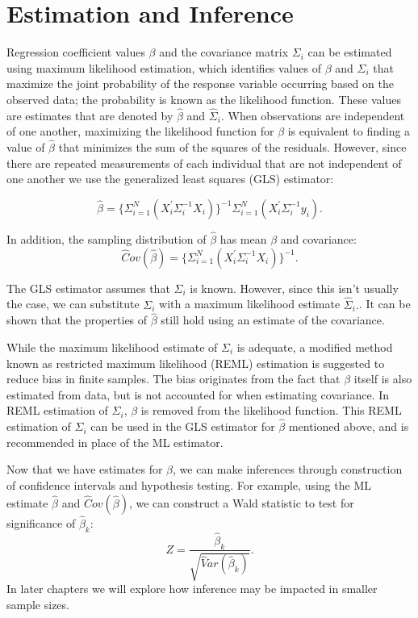\documentclass[12pt, twoside]{amherstthesis}
\begin{document}
\hypertarget{estimation-and-inference}{%
\section{Estimation and Inference}\label{estimation-and-inference}}

Regression coefficient values \(\beta\) and the covariance matrix \(\Sigma_i\) can be estimated using maximum likelihood estimation, which identifies values of \(\beta\) and \(\Sigma_i\) that maximize the joint probability of the response variable occurring based on the observed data; the probability is known as the likelihood function. These values are estimates that are denoted by \(\hat\beta\) and \(\hat\Sigma_i.\) When observations are independent of one another, maximizing the likelihood function for \(\beta\) is equivalent to finding a value of \(\hat\beta\) that minimizes the sum of the squares of the residuals. However, since there are repeated measurements of each individual that are not independent of one another we use the generalized least squares (GLS) estimator:

\[\hat\beta = \{ \Sigma_{i=1}^N(X_i^{'}\Sigma^{-1}_iX_i) \}^{-1}\Sigma_{i=1}^N(X_i^{'}\Sigma^{-1}_iy_i).\]

In addition, the sampling distribution of \(\hat\beta\) has mean \(\beta\) and covariance:
\[\hat Cov(\hat\beta) = \{ \Sigma_{i=1}^N(X_i^{'}\Sigma^{-1}_iX_i) \}^{-1}.\]

The GLS estimator assumes that \(\Sigma_i\) is known. However, since this isn't usually the case, we can substitute \(\Sigma_i\) with a maximum likelihood estimate \(\hat\Sigma_i.\). It can be shown that the properties of \(\hat\beta\) still hold using an estimate of the covariance.

While the maximum likelihood estimate of \(\Sigma_i\) is adequate, a modified method known as restricted maximum likelihood (REML) estimation is suggested to reduce bias in finite samples. The bias originates from the fact that \(\beta\) itself is also estimated from data, but is not accounted for when estimating covariance. In REML estimation of \(\Sigma_i\), \(\beta\) is removed from the likelihood function. This REML estimation of \(\Sigma_i\) can be used in the GLS estimator for \(\hat\beta\) mentioned above, and is recommended in place of the ML estimator.

Now that we have estimates for \(\beta\), we can make inferences through construction of confidence intervals and hypothesis testing. For example, using the ML estimate \(\hat\beta\) and \(\hat Cov(\hat\beta)\), we can construct a Wald statistic to test for significance of \(\hat \beta_k\):
\[Z = \frac{\hat \beta_k}{\sqrt{\hat Var(\hat \beta_k)}}.\] In later chapters we will explore how inference may be impacted in smaller sample sizes.
\end{document}
